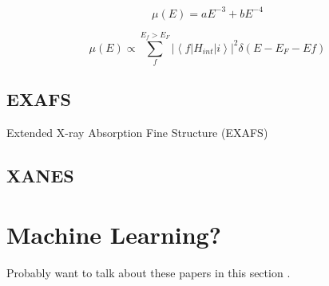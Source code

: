 \begin{equation}
    \label{Victoreen}
    \mu(E) = aE^{-3} + bE^{-4}
\end{equation}

\begin{equation}
    \label{FermisGoldenRule}
    \mu(E) \varpropto \sum_{f}^{E_f > E_F} \left\lvert \left\langle f \lvert H_{int} \rvert i \right\rangle \right\rvert ^2 \delta (E - E_F - Ef)  
\end{equation}

\subsection{EXAFS}
Extended X-ray Absorption Fine Structure (EXAFS)


\subsection{XANES}

\section{Machine Learning?}

Probably want to talk about these papers in this section \cite{timoshenko2018neural} \cite{Timoshenko2017}.